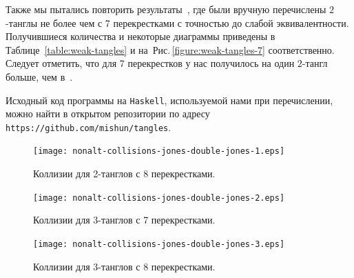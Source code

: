 \documentclass[12pt]{article}
\theoremstyle{plain}
\theoremstyle{definition}
\def\figureref#1{Рис.\,\protect\ref{#1}}
\begin{document}
		Также мы пытались повторить результаты~\cite{KanenobuSaitoSatoh2003}, где были вручную перечислены $2$-танглы не более чем
		с 7 перекрестками с точностью до слабой эквивалентности. Получившиеся количества и некоторые диаграммы приведены в
		Таблице~\ref{table:weak-tangles} и на~\figureref{figure:weak-tangles-7} соответственно. Следует отметить, что для 7
		перекрестков у нас получилось на один $2$-тангл больше, чем в~\cite{KanenobuSaitoSatoh2003}.

		Исходный код программы на \texttt{Haskell}, используемой нами при перечислении, можно найти в открытом репозитории по
		адресу \texttt{https://github.com/mishun/tangles}.

		\begin{figure}[ht]
			\centering
			\texttt{[image: nonalt-collisions-jones-double-jones-1.eps]}
			\caption{\footnotesize Коллизии для 2-танглов с 8 перекрестками.\label{figure:nonalt-collisions-8-2}}
		\end{figure}

		\begin{figure}[ht]
			\centering
			\texttt{[image: nonalt-collisions-jones-double-jones-2.eps]}
			\caption{\footnotesize Коллизии для 3-танглов с 7 перекрестками.\label{figure:nonalt-collisions-7-3}}
		\end{figure}

		\begin{figure}[ht]
			\centering
			\texttt{[image: nonalt-collisions-jones-double-jones-3.eps]}
			\caption{\footnotesize Коллизии для 3-танглов с 8 перекрестками.\label{figure:nonalt-collisions-8-3}}
		\end{figure}
\end{document}
